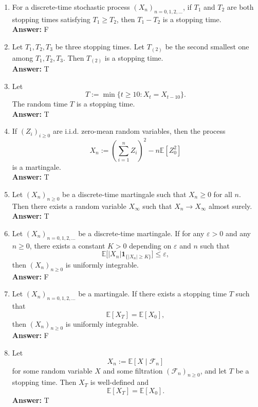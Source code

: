 \documentclass[11pt]{article}
\theoremstyle{definition}
\begin{document}
\begin{enumerate}[label=(\arabic*)]
    \item For a discrete-time stochastic process \((X_n)_{n=0,1,2,\dots}\), if \(T_1\) and \(T_2\) are both stopping times satisfying \(T_1\ge T_2\), then \(T_1-T_2\) is a stopping time. \\
    \textbf{Answer:} F

    \item Let \(T_1,T_2,T_3\) be three stopping times. Let \(T_{(2)}\) be the second smallest one among \(T_1,T_2,T_3\). Then \(T_{(2)}\) is a stopping time. \\
    \textbf{Answer:} T

    \item Let
    \[
    T:=\min\{t\ge 10:X_t=X_{t-10}\}.
    \]
    The random time \(T\) is a stopping time. \\
    \textbf{Answer:} T

    \item If \((Z_i)_{i\ge 0}\) are i.i.d. zero-mean random variables, then the process
    \[
    X_n:=\left(\sum_{i=1}^n Z_i\right)^2-n\mathbb E[Z_0^2]
    \]
    is a martingale. \\
    \textbf{Answer:} T

    \item Let \((X_n)_{n\ge 0}\) be a discrete-time martingale such that \(X_n\ge 0\) for all \(n\). Then there exists a random variable \(X_\infty\) such that \(X_n\to X_\infty\) almost surely. \\
    \textbf{Answer:} T

    \item Let \((X_n)_{n=0,1,2,\dots}\) be a discrete-time martingale. If for any \(\varepsilon>0\) and any \(n\ge 0\), there exists a constant \(K>0\) depending on \(\varepsilon\) and \(n\) such that
    \[
    \mathbb E\bigl[|X_n|\mathbf 1_{\{|X_n|\ge K\}}\bigr]\le \varepsilon,
    \]
    then \((X_n)_{n\ge 0}\) is uniformly integrable. \\
    \textbf{Answer:} F

    \item Let \((X_n)_{n=0,1,2,\dots}\) be a martingale. If there exists a stopping time \(T\) such that
    \[
    \mathbb E[X_T]=\mathbb E[X_0],
    \]
    then \((X_n)_{n\ge 0}\) is uniformly integrable. \\
    \textbf{Answer:} F

    \item Let
    \[
    X_n:=\mathbb E[X\mid \mathcal F_n]
    \]
    for some random variable \(X\) and some filtration \((\mathcal F_n)_{n\ge 0}\), and let \(T\) be a stopping time. Then \(X_T\) is well-defined and
    \[
    \mathbb E[X_T]=\mathbb E[X_0].
    \]
    \textbf{Answer:} T


\end{enumerate}
\end{document}
